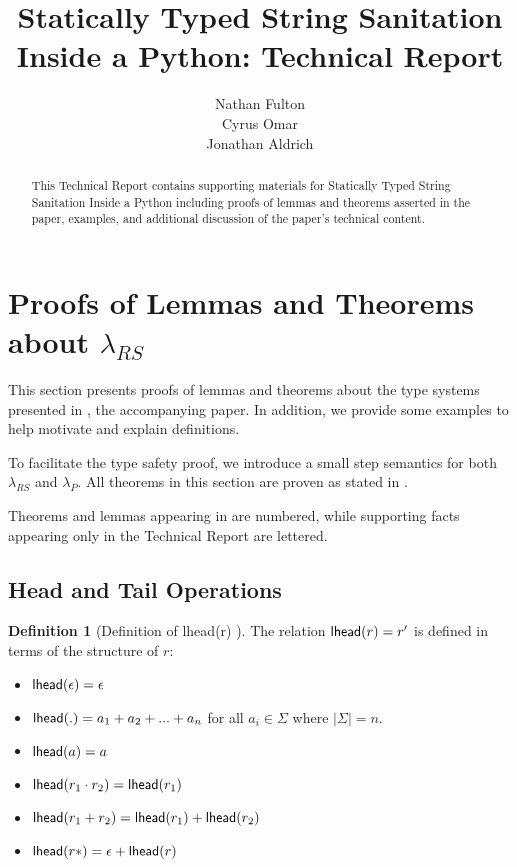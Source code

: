 \documentclass[12pt]{article}
\title{Statically Typed String Sanitation Inside a Python: Technical Report}
\author{Nathan Fulton \\ Cyrus Omar \\ Jonathan Aldrich}
\theoremstyle{definition}
\newtheorem{defn}[thm]{Definition}
\newcommand{\lambdas}{\lambda_{RS}}
\newcommand{\lambdap}{\lambda_P}
\newcommand{\lhead}[1]{ {\sf lhead}(#1) }
\begin{document}
\linenumbers

\maketitle

\begin{abstract}
This Technical Report contains supporting materials for Statically Typed
String Sanitation Inside a Python \cite{fulton2014} including proofs of lemmas
and theorems asserted in the paper, examples, and additional discussion of
the paper's technical content.
\end{abstract}

\section{Proofs of Lemmas and Theorems about $\lambdas$}

This section presents proofs of lemmas and theorems about the type systems
presented in \cite{fulton2014}, the accompanying paper. In addition, we provide some examples to help 
motivate and explain definitions.

To facilitate the type safety proof, we introduce
a small step semantics for both $\lambdas$ and $\lambdap$. All theorems in
this section are proven as stated in \cite{fulton2014}.

Theorems and lemmas appearing in \cite{fulton2014} are numbered, while
supporting facts appearing only in the Technical Report are lettered.

\subsection{Head and Tail Operations}

\begin{defn}[Definition of \lhead{r}]\label{def:lhead}
The relation $\lhead{r}=r'$ is defined in terms of the structure of $r$:
\begin{itemize}[noitemsep]
\item $\lhead{\epsilon} = \epsilon$
\item $\lhead{.} = a_1 + a_2 + ... + a_n$ for all $a_i \in \Sigma$ where $|\Sigma| = n$.
\item $\lhead{a} = a$ %
\item $\lhead{r_1\cdot r_2} = \lhead{r_1}$
\item $\lhead{r_1 +  r_2}  = \lhead{r_1} + \lhead{r_2}$
\item $\lhead{r*} = \epsilon + \lhead{r}$
\end{itemize}
\end{defn}
\end{document}
